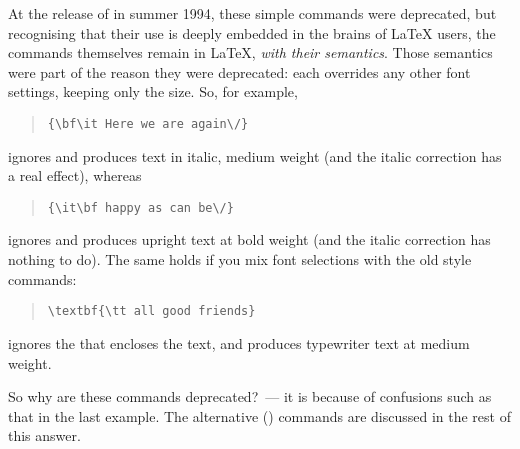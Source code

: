 At the release of \LaTeXe{} in summer 1994, these simple commands were
deprecated, but recognising that their use is deeply embedded in the
brains of \LaTeX{} users, the commands themselves remain in \LaTeX{},
\emph{with their \LaTeXo{} semantics}.  Those semantics were part of
the reason they were deprecated: each  overrides
any other font settings, keeping only the size.  So, for example,
\begin{quote}
\begin{verbatim}
{\bf\it Here we are again\/}
\end{verbatim}
\end{quote}
ignores  and produces text in italic, medium weight (and the
italic correction has a real effect), whereas
\begin{quote}
\begin{verbatim}
{\it\bf happy as can be\/}
\end{verbatim}
\end{quote}
ignores  and produces upright text at bold weight (and the
italic correction has nothing to do).  The same holds if you mix
\LaTeXe{} font selections with the old style commands:
\begin{quote}
\begin{verbatim}
\textbf{\tt all good friends}
\end{verbatim}
\end{quote}
ignores the  that encloses the text, and produces
typewriter text at medium weight.

So why are these commands deprecated?~--- it is because of confusions
such as that in the last example.  The alternative (\LaTeXe{})
commands are discussed in the rest of this answer.

